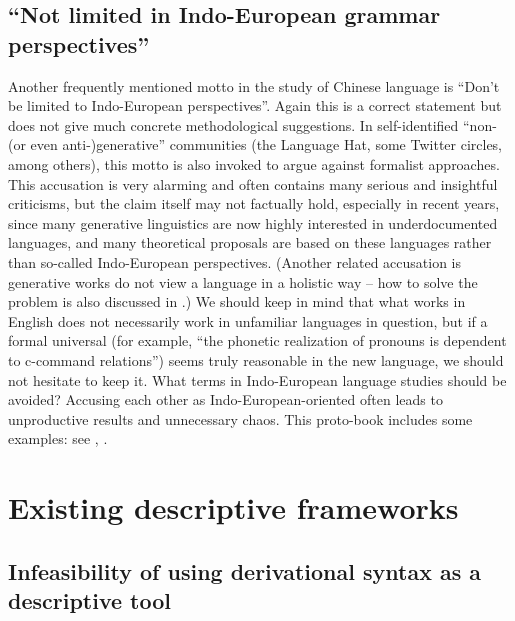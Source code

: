 \documentclass[../main.tex]{subfiles}
\begin{document}
\subsection{``Not limited in Indo-European grammar perspectives''}

Another frequently mentioned motto in the study of Chinese language is ``Don't be limited to Indo-European
perspectives''. Again this is a correct statement but does not give much concrete methodological suggestions.
In self-identified ``non-(or even anti-)generative'' communities (the Language Hat, some Twitter circles, 
among others), this motto is also invoked to argue against formalist approaches. This accusation is very alarming and often contains many serious and insightful criticisms, but the claim itself may not factually 
hold, especially in recent years, since many generative linguistics are now highly interested in
underdocumented languages, and many theoretical proposals \citep{preminger2014agreement} are based on %
these languages rather than so-called Indo-European perspectives. (Another related accusation is 
generative works do not view a language in a holistic way -- how to solve the problem is also 
discussed in .) We should keep in mind 
that what works in English does not necessarily work in unfamiliar languages in question, but if 
a formal universal (for example, ``the phonetic realization of pronouns is dependent to c-command relations'')
seems truly reasonable in the new language, we should not hesitate to keep it.
What terms in Indo-European language studies should be avoided? Accusing each other as Indo-European-oriented 
often leads to unproductive results and unnecessary chaos. This proto-book includes some examples: 
see , . %

\section{Existing descriptive frameworks}\label{sec:descriptive-framework}

\subsection{Infeasibility of using derivational syntax as a descriptive tool}\label{sec:generative-no-good}
\end{document}
